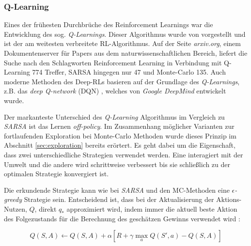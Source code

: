 \subsubsection{Q-Learning}
Eines der frühesten Durchbrüche des Reinforcement Learnings war die Entwicklung des sog. \textit{Q-Learnings}. Dieser Algorithmus wurde von \cite{watkins1989learning} vorgestellt und ist der am weitesten verbreitete RL-Algorithmus. Auf der Seite \textit{arxiv.org}, einem Dokumentenserver für Papers aus dem naturwissenschaftlichen Bereich, liefert die Suche nach den Schlagworten \glqq Reinforcement Learning\grqq{} in Verbindung mit \glqq Q-Learning \grqq{} 774 Treffer, \glqq SARSA \grqq{} hingegen nur 47 und \glqq Monte-Carlo\grqq{} 135. Auch moderne Methoden des Deep-RLs basieren auf der Grundlage des \textit{Q-Learnings}, z.B. das \textit{deep Q-network} (DQN) \cite{dqn}, welches von \textit{Google DeepMind} entwickelt wurde.
\par 
Der markanteste Unterschied des \textit{Q-Learning} Algorithmus im Vergleich zu \textit{SARSA} ist das Lernen \textit{off-policy}. Im Zusammenhang möglicher Varianten zur fortlaufenden Exploration bei Monte-Carlo Methoden wurde dieses Prinzip im Abschnitt \ref{sec:exploration} bereits erörtert. Es geht dabei um die Eigenschaft, dass zwei unterschiedliche Strategien verwendet werden. Eine interagiert mit der Umwelt und die andere wird schrittweise verbessert bis sie schließlich zu der optimalen Strategie konvergiert ist. 
\par 
Die erkundende Strategie kann wie bei \textit{SARSA} und den MC-Methoden eine $\epsilon$\textit{-greedy} Strategie sein. 
 Entscheidend ist, dass bei der Aktualisierung der Aktions-Nutzen, $Q$, direkt $q_*$ approximiert wird, indem immer die aktuell beste Aktion des Folgezustands für die Berechnung des geschätzen Gewinns verwendet wird \cite[S.131]{Sutton1998}: 

\begin{equation}
    Q(S,A) \gets Q(S,A) + \alpha [R + \gamma \max_a Q(S',a) - Q(S,A)]
\end{equation}

